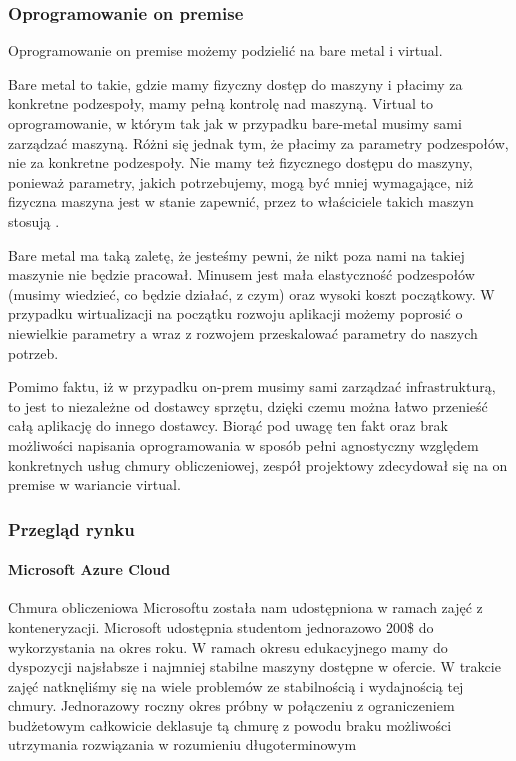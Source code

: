 \subsubsection{Oprogramowanie on premise}
Oprogramowanie on premise możemy podzielić na bare metal i virtual.

Bare metal to takie, gdzie mamy fizyczny dostęp do maszyny i płacimy za konkretne podzespoły, mamy pełną kontrolę nad maszyną.
Virtual to oprogramowanie, w którym tak jak w przypadku bare-metal musimy sami zarządzać maszyną.
Różni się jednak tym, że płacimy za parametry podzespołów, nie za konkretne podzespoły.
Nie mamy też fizycznego dostępu do maszyny, ponieważ parametry, jakich potrzebujemy, mogą być mniej wymagające, niż fizyczna maszyna jest w stanie zapewnić, przez to właściciele takich maszyn stosują .

Bare metal ma taką zaletę, że jesteśmy pewni, że nikt poza nami na takiej maszynie nie będzie pracował.
Minusem jest mała elastyczność podzespołów (musimy wiedzieć, co będzie działać, z czym) oraz wysoki koszt początkowy.
W przypadku wirtualizacji na początku rozwoju aplikacji możemy poprosić o niewielkie parametry a wraz z rozwojem przeskalować parametry do naszych potrzeb.

Pomimo faktu, iż w przypadku \gls{on-prem} musimy sami zarządzać infrastrukturą, to jest to niezależne od dostawcy sprzętu, dzięki czemu można łatwo przenieść całą aplikację do innego dostawcy.
Biorąć pod uwagę ten fakt oraz brak możliwości napisania oprogramowania w sposób pełni agnostyczny względem konkretnych usług chmury obliczeniowej, zespół projektowy zdecydował się na on premise w wariancie virtual.

\subsubsection{Przegląd rynku}
\paragraph{Microsoft Azure Cloud}
Chmura obliczeniowa Microsoftu została nam udostępniona w ramach zajęć z konteneryzacji.
Microsoft udostępnia studentom jednorazowo 200\$ do wykorzystania na okres roku.
W ramach okresu edukacyjnego mamy do dyspozycji najsłabsze i najmniej stabilne maszyny dostępne w ofercie.
W trakcie zajęć natknęliśmy się na wiele problemów ze stabilnością i wydajnością tej chmury.
Jednorazowy roczny okres próbny w połączeniu z ograniczeniem budżetowym całkowicie deklasuje tą chmurę z powodu braku możliwości utrzymania rozwiązania w rozumieniu długoterminowym

